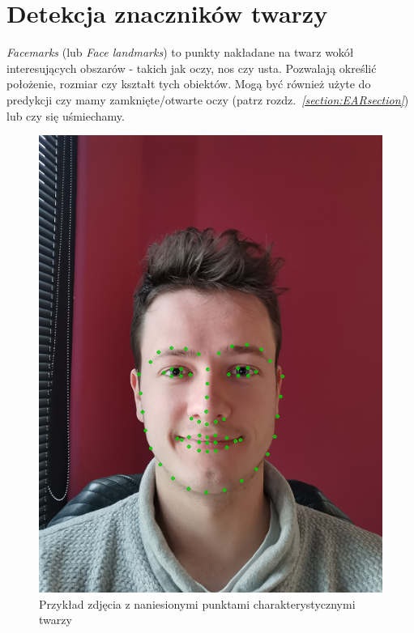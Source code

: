 \newpage

\section{Detekcja znaczników twarzy} \label{section:landmarks}

\textit{Facemarks} (lub \textit{Face landmarks}) to punkty nakładane na twarz wokół interesujących obszarów - takich jak oczy, nos czy usta. Pozwalają określić położenie, rozmiar czy kształt tych obiektów. Mogą być również użyte do predykcji czy mamy zamknięte/otwarte oczy (patrz rozdz.~\hyperref[section:EARsection]{\textit{\ref{section:EARsection}}}) lub czy się uśmiechamy. 

\begin{figure}[!h]
    \begin{center}
        \includegraphics[scale=0.6]{img/landmark_section/landmarks_1.png}
        \caption{Przykład zdjęcia z naniesionymi punktami charakterystycznymi twarzy}
        \label{fig:landmarks_1}
    \end{center}
\end{figure}

